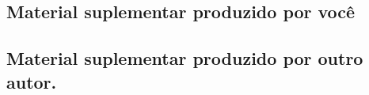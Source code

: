 \documentclass[
	12pt,				%
	openright,			%
	oneside,			%
	a4paper,			%
	english,			%
	brazil				%
	]{abntex2}
\begin{document}

\begin{apendicesenv}

\partapendices

\chapter{Material suplementar produzido por você}

\lipsum[50]



\end{apendicesenv}



\begin{anexosenv}

\partanexos

\chapter{Material suplementar produzido por outro autor.}
\lipsum[30]

\end{anexosenv}

\printindex
\end{document}
